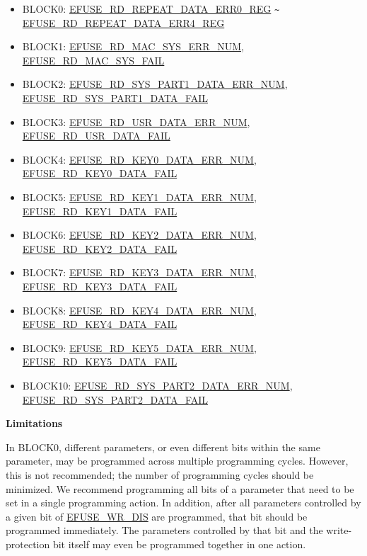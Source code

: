 \documentclass[main\_\_EN.tex]{subfiles}
\begin{document}
\begin{enumerate}
\begin{itemize}
    \item BLOCK0: \hyperref[regdesc:EFUSERDREPEATDATAERR0REG]{EFUSE\_RD\_REPEAT\_DATA\_ERR0\_REG} \verb+~+ \hyperref[regdesc:EFUSERDREPEATDATAERR4REG]{EFUSE\_RD\_REPEAT\_DATA\_ERR4\_REG}
    \item BLOCK1: \hyperref[fielddesc:EFUSERDMACSYSERRNUM]{EFUSE\_RD\_MAC\_SYS\_ERR\_NUM}, \hyperref[fielddesc:EFUSERDMACSYSFAIL]{EFUSE\_RD\_MAC\_SYS\_FAIL}
    \item BLOCK2: \hyperref[fielddesc:EFUSERDSYSPART1DATAERRNUM]{EFUSE\_RD\_SYS\_PART1\_DATA\_ERR\_NUM}, \hyperref[fielddesc:EFUSERDSYSPART1DATAFAIL]{EFUSE\_RD\_SYS\_PART1\_DATA\_FAIL}
    \item BLOCK3: \hyperref[fielddesc:EFUSERDUSRDATAERRNUM]{EFUSE\_RD\_USR\_DATA\_ERR\_NUM}, \hyperref[fielddesc:EFUSERDUSRDATAFAIL]{EFUSE\_RD\_USR\_DATA\_FAIL}
    \item BLOCK4: \hyperref[fielddesc:EFUSERDKEY0DATAERRNUM]{EFUSE\_RD\_KEY0\_DATA\_ERR\_NUM}, \hyperref[fielddesc:EFUSERDKEY0DATAFAIL]{EFUSE\_RD\_KEY0\_DATA\_FAIL}
    \item BLOCK5: \hyperref[fielddesc:EFUSERDKEY1DATAERRNUM]{EFUSE\_RD\_KEY1\_DATA\_ERR\_NUM}, \hyperref[fielddesc:EFUSERDKEY1DATAFAIL]{EFUSE\_RD\_KEY1\_DATA\_FAIL}
    \item BLOCK6: \hyperref[fielddesc:EFUSERDKEY2DATAERRNUM]{EFUSE\_RD\_KEY2\_DATA\_ERR\_NUM}, \hyperref[fielddesc:EFUSERDKEY2DATAFAIL]{EFUSE\_RD\_KEY2\_DATA\_FAIL}
    \item BLOCK7: \hyperref[fielddesc:EFUSERDKEY3DATAERRNUM]{EFUSE\_RD\_KEY3\_DATA\_ERR\_NUM}, \hyperref[fielddesc:EFUSERDKEY3DATAFAIL]{EFUSE\_RD\_KEY3\_DATA\_FAIL}
    \item BLOCK8: \hyperref[fielddesc:EFUSERDKEY4DATAERRNUM]{EFUSE\_RD\_KEY4\_DATA\_ERR\_NUM}, \hyperref[fielddesc:EFUSERDKEY4DATAFAIL]{EFUSE\_RD\_KEY4\_DATA\_FAIL}
    \item BLOCK9: \hyperref[fielddesc:EFUSERDKEY5DATAERRNUM]{EFUSE\_RD\_KEY5\_DATA\_ERR\_NUM}, \hyperref[fielddesc:EFUSERDKEY5DATAFAIL]{EFUSE\_RD\_KEY5\_DATA\_FAIL}
    \item BLOCK10: \hyperref[fielddesc:EFUSERDSYSPART2DATAERRNUM]{EFUSE\_RD\_SYS\_PART2\_DATA\_ERR\_NUM}, \hyperref[fielddesc:EFUSERDSYSPART2DATAFAIL]{EFUSE\_RD\_SYS\_PART2\_DATA\_FAIL}
\end{itemize}
\end{enumerate}

{\bfseries Limitations}

In BLOCK0, different parameters, or even different bits within the same parameter, may be programmed across multiple programming cycles. However, this is not recommended; the number of programming cycles should be minimized. We recommend programming all bits of a parameter that need to be set in a single programming action. In addition, after all parameters controlled by a given bit of \hyperref[fielddesc:EFUSEWRDIS]{EFUSE\_WR\_DIS} are programmed, that bit should be programmed immediately. The parameters controlled by that bit and the write-protection bit itself may even be programmed together in one action. 
\end{document}

